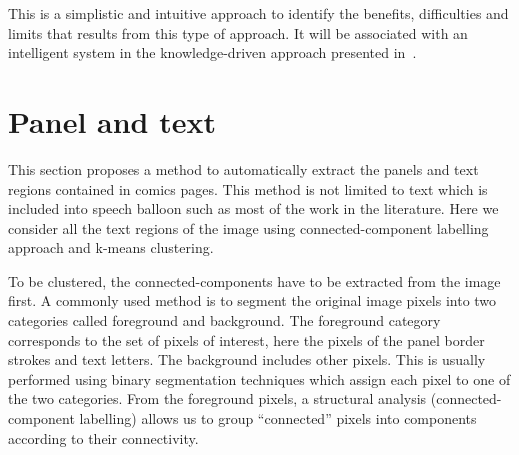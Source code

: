 This is a simplistic and intuitive approach to identify the benefits, difficulties and limits that results from this type of approach.
It will be associated with an intelligent system in the knowledge-driven approach presented in~.



\section{Panel and text} %
\label{sec:se:panel_and_text}


This section proposes a method to automatically extract the panels and text regions contained in comics pages.
This method is not limited to text which is included into speech balloon such as most of the work in the literature.
Here we consider all the text regions of the image using connected-component labelling approach and k-means clustering.


To be clustered, the connected-components have to be extracted from the image first.
A commonly used method is to segment the original image pixels into two categories called foreground and background.
The foreground category corresponds to the set of pixels of interest, here the pixels of the panel border strokes and text letters.
The background includes other pixels.
This is usually performed using binary segmentation techniques which assign each pixel to one of the two categories.
From the foreground pixels, a structural analysis (connected-component labelling) allows us to group ``connected'' pixels into components according to their connectivity.

